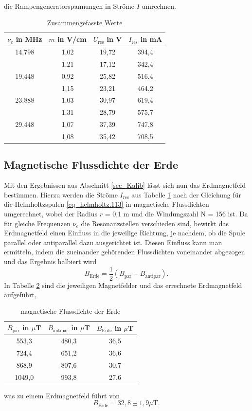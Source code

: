 die Rampengeneratorspannungen in Ströme $I$ umrechnen.
\begin{table}[H]
 \begin{tabular}{c|c|c|c}
  $\nu_e$ in MHz & $m$ in V/cm & $U_\text{res}$ in V & $I_\text{res}$ in mA\\
  \hline
  14,798 & 1,02 & 19,72 & 394,4 \\
  & 1,21&17,12 & 342,4\\
  19,448&0,92 &25,82 & 516,4\\
  &1,15&23,21& 464,2\\
  23,888&1,03&30,97& 619,4\\
  &1,31&28,79&575,7\\
  29,448&1,07&37,39&747,8\\
  &1,08&35,42&708,5\\
 \end{tabular}
\caption{Zusammengefasste Werte}
\label{tab_xAxisKalibTOTAL}
\end{table}

\subsection{Magnetische Flussdichte der Erde}
Mit den Ergebnissen aus Abschnitt \ref{sec_Kalib} lässt sich nun das Erdmagnetfeld bestimmen. Hierzu werden die Ströme $I_\text{res}$ aus Tabelle
\ref{tab_xAxisKalibTOTAL} nach der Gleichung für die Helmholtzspulen \eqref{eq_helmholtz.113} in magnetische Flussdichten umgerechnet, wobei der Radius
$r$ = 0,1 m und die Windungszahl N = 156 ist. Da für gleiche Frequenzen $\nu_e$ die Resonanzstellen verschieden sind, bewirkt das Erdmagnetfeld einen
Einfluss in die jeweilige Richtung, je nachdem, ob die Spule parallel oder antiparallel dazu ausgerichtet ist. Diesen Einfluss kann man ermitteln,
indem die zueinander gehörenden Flussdichten voneinander abgezogen und das Ergebnis halbiert wird
\begin{equation}
 B_\text{Erde} = \frac12 ( B_\text{par} - B_\text{antipar}).
\end{equation}
In Tabelle \ref{tab_erdMagnetfeld} sind die jeweiligen Magnetfelder und das errechnete Erdmagnetfeld aufgeführt,
\begin{table}[H]
 \begin{tabular}{c|c|c}
 $B_\text{par}$ in $\mu$T & $B_\text{antipar}$ in $\mu$T& $B_\text{Erde}$ in $\mu$T\\
 \hline
 553,3 &	480,3&	36,5\\
724,4&	651,2&	36,6 \\
868,9&	807,6&	30,7\\
1049,0&	993,8&	27,6\\
 \end{tabular}
\caption{magnetische Flussdichte der Erde}
\label{tab_erdMagnetfeld}
\end{table}
was zu einem Erdmagnetfeld führt von 
\begin{equation}
 B_\text{Erde} = 32,8 \pm 1,9 \mu\text{T}.
\end{equation}

